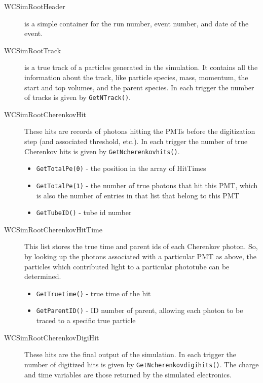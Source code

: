 \begin{description}
\begin{description}
    \begin{description}
      \item[WCSimRootHeader] is a simple container for the run number, event number, and date of the event.
      \item[WCSimRootTrack] is a true track of a particles generated in the simulation. It contains all the information about the track, like particle species, mass, momentum, the start and top volumes, and the parent species.  In each trigger the number of tracks is given by \texttt{GetNTrack()}.  %
      \item[WCSimRootCherenkovHit] These hits are records of photons hitting the PMTs before the digitization step (and associated threshold, etc.). In each trigger the number of true Cherenkov hits is given by \texttt{GetNcherenkovhits()}.
          \begin{itemize}
          \item \texttt{GetTotalPe(0)} - the position in the array of HitTimes
          \item \texttt{GetTotalPe(1)} - the number of true photons that hit this PMT, which is also the number of entries in that list that belong to this PMT
          \item \texttt{GetTubeID()} - tube id number
          \end{itemize}
      \item[WCSimRootCherenkovHitTime] This list stores the true time and parent ids of each Cherenkov photon.  So, by looking up the photons associated with a particular PMT as above, the particles which contributed light to a particular phototube can be determined.
          \begin{itemize}
          \item \texttt{GetTruetime()} - true time of the hit
          \item \texttt{GetParentID()} - ID number of parent, allowing each photon to be traced to a specific true particle
          \end{itemize}
      \item[WCSimRootCherenkovDigiHit] These hits are the final output of the simulation. In each trigger the number of digitized hits is given by \texttt{GetNcherenkovdigihits()}.  The charge and time variables are those returned by the simulated electronics.

\end{description}
\end{description}
\end{description}
